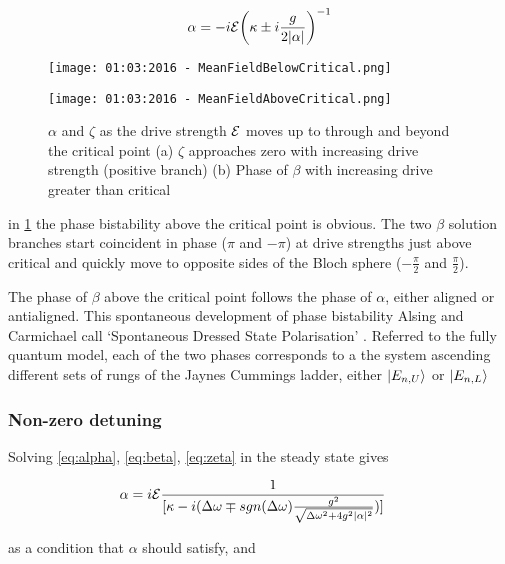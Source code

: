 \begin{equation}
  \alpha = -i \mathcal{E}{\left ( \kappa \pm i \frac{g}{2|\alpha|} \right )}^{-1}
  \label{eq:alphacondnotdet}
\end{equation}

\begin{figure}[ht]
  \begin{minipage}{.5\linewidth}
    \centering
    \texttt{[image: 01:03:2016 - MeanFieldBelowCritical.png]}
  \end{minipage}%
  \begin{minipage}{.5\linewidth}
    \centering
    \texttt{[image: 01:03:2016 - MeanFieldAboveCritical.png]}
  \end{minipage}
  \caption{$\alpha$ and $\zeta$ as the drive strength $\mathcal{E}$ moves up to through and beyond the critical point (a) $\zeta$ approaches zero with increasing drive strength (positive branch)\label{fig:zeta} (b) Phase of $\beta$ with increasing drive greater than critical}\label{fig:alpha}
\end{figure}

in \cref{fig:alpha} the phase bistability above the critical point is obvious. The two $\beta$ solution branches start coincident in phase ($\pi$ and $-\pi$) at drive strengths just above critical and quickly move to opposite sides of the Bloch sphere ($-\frac{\pi}{2}$ and $\frac{\pi}{2}$).

The phase of $\beta$ above the critical point follows the phase of $\alpha$, either aligned or antialigned. This spontaneous development of phase bistability Alsing and Carmichael call `Spontaneous Dressed State Polarisation' \cite{Alsing1990}. Referred to the fully quantum model, each of the two phases corresponds to a the system ascending different sets of rungs of the Jaynes Cummings ladder, either $| E_{n, U} \rangle$ or $| E_{n, L} \rangle$

\subsubsection{Non-zero detuning}
Solving \cref{eq:alpha}, \cref{eq:beta}, \cref{eq:zeta} in the steady state gives

\begin{align}
  \alpha& = i \mathcal{E}\frac{1}{[\kappa-i(\Delta \omega \mp sgn(\Delta \omega) \frac{g^2}{\sqrt{\Delta \omega^2 +4g^2 |\alpha|^2}})]}
\end{align}

as a condition that $\alpha$ should satisfy, and

